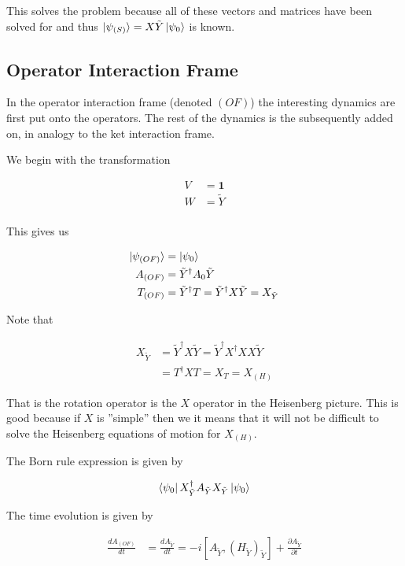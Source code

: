 \documentclass[12pt]{article}
\newcommand{\ddt}[1]{\frac{d #1}{dt}}
\newcommand{\ppt}[1]{\frac{\partial #1}{\partial t}}
\newcommand{\bv}[1]{\boldsymbol{#1}}
\begin{document}
This solves the problem because all of these vectors and matrices have been solved for and thus $\ket{\psi_{(S)}} = X\tilde{Y}\ket{\psi_0}$ is known.

\subsection{Operator Interaction Frame}

In the operator interaction frame (denoted $(OF)$) the interesting dynamics are first put onto the operators. The rest of the dynamics is the subsequently added on, in analogy to the ket interaction frame.

We begin with the transformation

\begin{align}
V &= \bv{1}\\
W &= \tilde{Y}\\
\end{align}

This gives us

\begin{align}
\ket{\psi_{(OF)}} &= \ket{\psi_0}\\
A_{(OF)} &= \tilde{Y}^{\dag}A_0\tilde{Y}\\
T_{(OF)} &= \tilde{Y}^{\dag} T = \tilde{Y}^{\dag} X \tilde{Y} = X_{\tilde{Y}}
\end{align}

Note that

\begin{align}
X_{\tilde{Y}} &= \tilde{Y}^{\dag} X \tilde{Y} = \tilde{Y}^{\dag} X^{\dag} X X \tilde{Y}\\
&= T^{\dag} X T = X_T = X_{(H)}
\end{align}

That is the rotation operator is the $X$ operator in the Heisenberg picture. This is good because if $X$ is ''simple'' then we it means that it will not be difficult to solve the Heisenberg equations of motion for $X_{(H)}$.

The Born rule expression is given by

\begin{align}
\bra{\psi_0} X_{\tilde{Y}}^{\dag} A_{\tilde{Y}} X_{\tilde{Y}} \ket{\psi_0}
\end{align}

The time evolution is given by

\begin{align}
\ddt{A_{(OF)}} &= \ddt{A_{\tilde{Y}}} = -i\left[A_{\tilde{Y}}, (H_{\tilde{Y}})_{\tilde{Y}}\right] + \ppt{A_{\tilde{Y}}}
\end{align}
\end{document}
